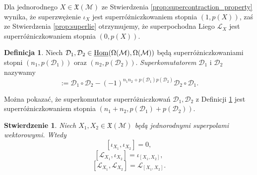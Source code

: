 \documentclass[11pt,a4paper]{report}
\newtheorem{proposition}[theorem]{Stwierdzenie}
\theoremstyle{definition}
\newtheorem{definition}[theorem]{Definicja}
\begin{document}
Dla jednorodnego $X \in \mathfrak X(\mathcal{M})$ ze Stwierdzenia \ref{prop:supercontraction_property} wynika, że superzwężenie $\iota_X$ jest superróżniczkowaniem stopnia $(1,p(X))$, zaś ze Stwierdzenia \ref{prop:superlie} otrzymujemy, że superpochodna Liego $\mathcal{L}_X$ jest superróżniczkowaniem stopnia $(0, p(X))$.

\begin{definition}
\label{def:supercommutator}
Niech $\mathcal{D}_1, \mathcal D_2 \in \underline{\rm Hom}(\Omega(\mathcal{M}),\Omega(\mathcal{M}))$ będą superróżniczkowaniami stopni $(n_1,p(\mathcal{D}_1))$ oraz $(n_2 ,p(\mathcal{D}_2))$. \textit{Superkomutatorem} $\mathcal{D}_1$ i $\mathcal D_2$ nazywamy
\begin{equation*}
[\mathcal D_1,\mathcal D_2] := \mathcal D_1\circ \mathcal D_2-(-1)^{n_1n_2+p(\mathcal{D}_1) p(\mathcal{D}_2)} \mathcal D_2\circ \mathcal D_1.
\end{equation*}
\end{definition}

Można pokazać, że superkomutator superróżniczkowań $\mathcal{D}_1, \mathcal D_2$ z Definicji \ref{def:supercommutator} jest superróżniczkowaniem stopnia $(n_1 + n_2, p(\mathcal D_1) + p(\mathcal D_2))$.

\begin{proposition}
Niech $X_1, X_2 \in \mathfrak X (\mathcal M)$ będą jednorodnymi superpolami wektorowymi. Wtedy 
\begin{equation}
\label{eq:supcom_supcon}
[\iota_{X_1},\iota_{X_2}] = 0,
\end{equation}
\begin{equation} 
\label{eq:supcom_suplie_supcon}
[\mathcal{L}_{X_1},\iota_{X_2}] = \iota_{[X_1,X_2]},
\end{equation}
\begin{equation}
\label{eq:supcom_supliex2}
[\mathcal{L}_{X_1},\mathcal{L}_{X_2}]=\mathcal{L}_{[X_1,X_2]}.
\end{equation}
\end{proposition}
\end{document}
